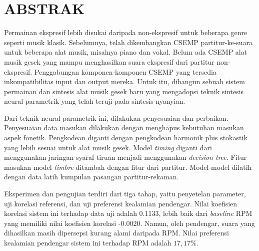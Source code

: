 \clearpage
\chapter*{ABSTRAK}

Permainan ekspresif lebih disukai daripada non-ekspresif untuk beberapa genre seperti musik klasik. Sebelumnya, telah dikembangkan CSEMP partitur-ke-suara untuk beberapa alat musik, misalnya piano dan vokal. Belum ada CSEMP alat musik gesek yang mampu menghasilkan suara ekspresif dari partitur non-ekspresif. Penggabungan komponen-komponen CSEMP yang tersedia inkompatibilitas input dan output mereka. Untuk itu, dibangun sebuah sistem permainan dan sintesis alat musik gesek baru yang mengadopsi teknik sintesis neural parametrik yang telah teruji pada sintesis nyanyian.

Dari teknik neural parametrik ini, dilakukan penyesuaian dan perbaikan. Penyesuaian data masukan dilakukan dengan menghapus kebutuhan masukan aspek fonetik. Pengkodean diganti dengan pengkodean harmonik plus stokastik yang lebih sesuai untuk alat musik gesek. Model \textit{timing} diganti dari menggunakan jaringan syaraf tiruan menjadi menggunakan \textit{decision tree}. Fitur masukan model \textit{timbre} ditambah dengan fitur dari partitur. Model-model dilatih dengan data latih kumpulan pasangan partitur-rekaman.

Eksperimen dan pengujian terdiri dari tiga tahap, yaitu penyetelan parameter, uji korelasi referensi, dan uji preferensi kealamian pendengar. Nilai koefisien korelasi sistem ini terhadap data uji adalah 0.1133, lebih baik dari \textit{baseline} RPM yang memiliki nilai koefisien korelasi -0.0020. Namun, oleh pendengar, suara yang dihasilkan masih dipersepsi kurang alami daripada RPM. Nilai preferensi kealamian pendengar sistem ini terhadap RPM adalah $17,17\%$.

\clearpage